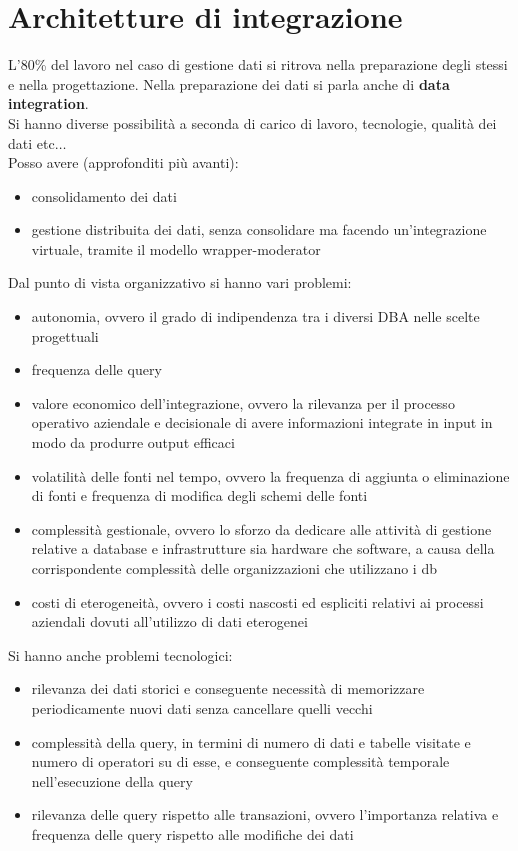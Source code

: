\documentclass[a4paper,12pt, oneside]{book}
\begin{document}
\chapter{Architetture di integrazione}
L'80\% del lavoro nel caso di gestione dati si ritrova nella preparazione degli
stessi e nella progettazione.
Nella preparazione dei dati si parla anche di \textbf{data integration}.\\
Si hanno diverse possibilità a seconda di carico di lavoro, tecnologie, qualità
dei dati etc$\ldots$\\
Posso avere (approfonditi più avanti):
\begin{itemize}
  \item consolidamento dei dati
  \item gestione distribuita dei dati, senza consolidare ma facendo
  un'integrazione virtuale, tramite il modello wrapper-moderator
\end{itemize}
Dal punto di vista organizzativo si hanno vari problemi:
\begin{itemize}
  \item autonomia, ovvero il grado di indipendenza tra i diversi DBA nelle
  scelte progettuali
  \item frequenza delle query
  \item valore economico dell'integrazione, ovvero la rilevanza per il processo
  operativo aziendale e decisionale di avere informazioni integrate in input in
  modo da produrre output efficaci
  \item volatilità delle fonti nel tempo, ovvero la frequenza di aggiunta o
  eliminazione di fonti e frequenza di modifica degli schemi delle fonti
  \item complessità gestionale, ovvero lo sforzo da dedicare alle attività di
  gestione relative a database e infrastrutture sia hardware che software, a
  causa della corrispondente complessità delle organizzazioni che utilizzano i
  db
  \item costi di eterogeneità, ovvero i costi nascosti ed espliciti relativi ai
  processi aziendali dovuti all'utilizzo di dati eterogenei
\end{itemize}
Si hanno anche problemi tecnologici:
\begin{itemize}
  \item rilevanza dei dati storici e conseguente necessità di memorizzare
  periodicamente nuovi dati senza cancellare quelli vecchi
  \item complessità della query, in termini di numero di dati e tabelle visitate
  e numero di operatori su di esse, e conseguente complessità temporale
  nell'esecuzione della query
  \item rilevanza delle query rispetto alle transazioni, ovvero l'importanza
  relativa e frequenza delle query rispetto alle modifiche dei dati 
\end{itemize}
\end{document}
